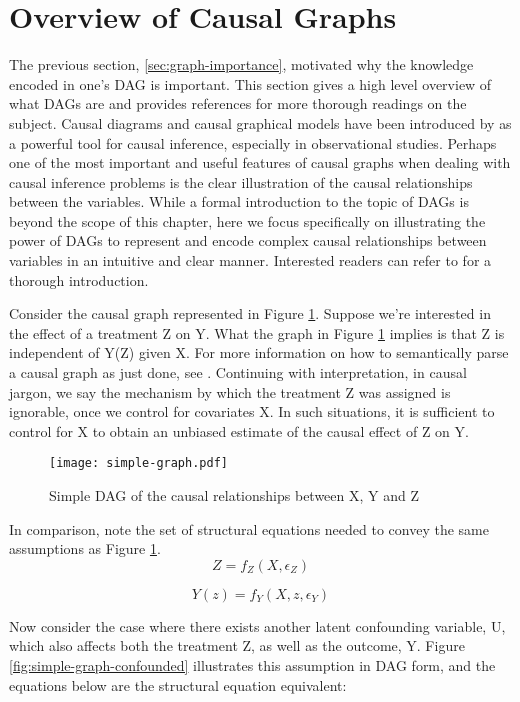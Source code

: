 \section{Overview of Causal Graphs}
\label{sec:graph-overview}
The previous section, \ref{sec:graph-importance}, motivated why the knowledge encoded in one's DAG is important.
This section gives a high level overview of what DAGs are and provides references for more thorough readings on the subject.
Causal diagrams and causal graphical models have been introduced by \citet{pearl_1995_causal} as a powerful tool for causal inference, especially in observational studies.
Perhaps one of the most important and useful features of causal
graphs when dealing with causal inference problems is the clear illustration
of the causal relationships between the variables.
While a formal introduction to the topic of DAGs is beyond the scope of this chapter,
here we focus specifically on illustrating the power of DAGs to represent
and encode complex causal relationships between variables in an intuitive and
clear manner.
Interested readers can refer to \citet{pearl_causality_2000} for a thorough introduction.

Consider the causal graph represented in Figure \ref{fig:simple-graph}.
Suppose we're interested in the effect of a treatment Z on Y.
What the graph in Figure \ref{fig:simple-graph} implies is that Z is
independent of Y(Z) given X.
For more information on how to semantically parse a causal graph as just done, see \citet[Ch 11.1]{pearl_2009_causality}.
Continuing with interpretation, in causal jargon, we say the mechanism by which the treatment Z was assigned is ignorable, once we control for covariates X.
In such situations, it is sufficient to control for X to obtain an unbiased estimate of the causal effect of Z on Y.

\begin{figure}[h!]
   \centering
   \texttt{[image: simple-graph.pdf]}
   \caption{Simple DAG of the causal relationships between X, Y and Z}
   \label{fig:simple-graph}
\end{figure}

In comparison, note the set of structural equations needed to convey the same assumptions as Figure \ref{fig:simple-graph}.
\[Z = f_Z(X, \epsilon_Z)  \]

\[Y(z) = f_Y(X, z, \epsilon_Y)  \]

Now consider the case where there exists another latent confounding variable, U, which also affects both the treatment Z, as well as the outcome, Y.
Figure \ref{fig:simple-graph-confounded} illustrates this assumption in DAG form, and the equations below are the structural equation equivalent:


